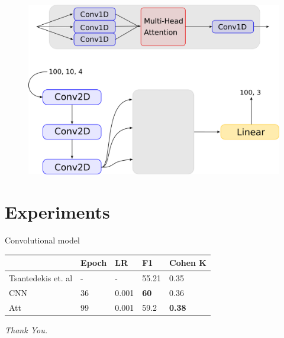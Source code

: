 \documentclass{beamer}
\begin{document}
\begin{frame}
    \begin{figure}
        \centering
        \includegraphics[scale=0.35]{imgs/attention.png}
    \end{figure}
\end{frame}

\section{Experiments}
\begin{frame}{Convolutional model}
    \begin{center}
        \begin{tabular}{ l l l l l }
                               & \textbf{Epoch} & \textbf{LR} & \textbf{F1} & \textbf{Cohen K} \\
            \hline
            Tsantedekis et. al & -              & -           & 55.21       & 0.35             \\
            CNN                & 36             & 0.001       & \textbf{60} & 0.36             \\
            Att                & 99             & 0.001       & 59.2        & \textbf{0.38}    \\
            \hline
        \end{tabular}
    \end{center}
\end{frame}

\begin{frame}
    \centering
    \huge{\textit{Thank You.}}
\end{frame}
\end{document}
